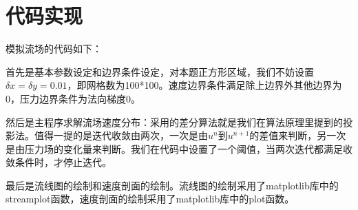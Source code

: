 \documentclass[12pt,a4paper]{article}
\begin{document}
\section{代码实现}
模拟流场的代码如下：

首先是基本参数设定和边界条件设定，对本题正方形区域，我们不妨设置$\delta x = \delta y = 0.01$，即网格数为100*100。速度边界条件满足除上边界外其他边界为0，压力边界条件为法向梯度0。

然后是主程序求解流场速度分布：采用的差分算法就是我们在算法原理里提到的投影法。值得一提的是迭代收敛由两次，一次是由$u^{n}$到$u^{n+1}$的差值来判断，另一次是由压力场的变化量来判断。我们在代码中设置了一个阈值，当两次迭代都满足收敛条件时，才停止迭代。

最后是流线图的绘制和速度剖面的绘制。流线图的绘制采用了matplotlib库中的streamplot函数，速度剖面的绘制采用了matplotlib库中的plot函数。

\newpage   
\end{document}
